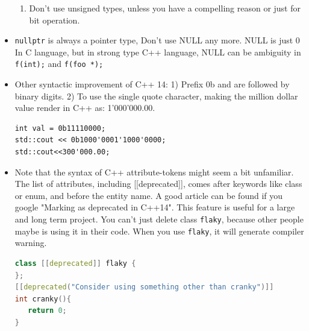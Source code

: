 \documentclass[a4paper,11pt,twoside]{book}
\begin{document}
\begin{itemize}
\begin{enumerate}
	\item Don't use unsigned types, unless you have a compelling reason or just for bit operation.
\end{enumerate}

    \item \texttt{nullptr} is always a pointer type, Don't use NULL any more. NULL is just 0 In C language, but in strong type C++ language, NULL can be ambiguity in \texttt{f(int);} and \texttt{f(foo *);}

    \item Other syntactic improvement of C++ 14: 1) Prefix 0b and are followed by binary digits.  2) To use the single quote character, making the million dollar value render in C++ as: 1'000'000.00.
\begin{lstlisting}[numbers=none]
int val = 0b11110000;
std::cout << 0b1000'0001'1000'0000;
std::cout<<300'000.00;
\end{lstlisting}

    \item Note that the syntax of C++ attribute-tokens might seem a bit unfamiliar. The list of attributes, including [[deprecated]], comes after keywords like class or enum, and before the entity name. A good article can be found if you google "Marking as deprecated in C++14". This feature is useful for a large and long term project. You can't just delete class \texttt{flaky}, because other people maybe is using it in their code. When you use \texttt{flaky}, it will generate compiler warning.

\begin{lstlisting}[frame=single, language=c++]
class [[deprecated]] flaky {
};
[[deprecated("Consider using something other than cranky")]]
int cranky(){
   return 0;
}
\end{lstlisting}

\end{itemize}
\end{document}
